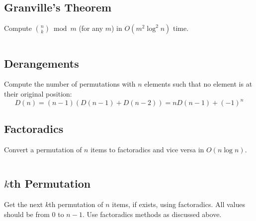 \documentclass[8pt,a4paper,landscape,oneside]{amsart}
\newcommand{\code}[1]{\inputminted[fontsize=\normalsize,baselinestretch=1]{cpp}{_code/#1}}
\begin{document}
\begin{multicols*}{3}
  \subsection{Granville's Theorem}
    Compute $\binom{n}{k} \bmod{m}$ (for any $m$) in $O(m^2 \log^2 n)$ time.
    \code{combs/granville.py}
  \subsection{Derangements}
    Compute the number of permutations with $n$ elements such that no element is at their original position:
    \[
    D(n) = (n-1) \left( D(n-1) + D(n-2) \right) =  n D(n-1) + (-1)^n
    \]
    \subsection{Factoradics}
    Convert a permutation of $n$ items to factoradics and vice versa in $O(n \log n)$.
    \code{combs/factoradics.cpp}
  \subsection{$k$th Permutation}
    Get the next $k$th permutation of $n$ items, if exists, using factoradics. All values should be from $0$ to $n-1$. Use factoradics methods as discussed above.
    \code{combs/kth-permutation.cpp}

\end{multicols*}
\end{document}
